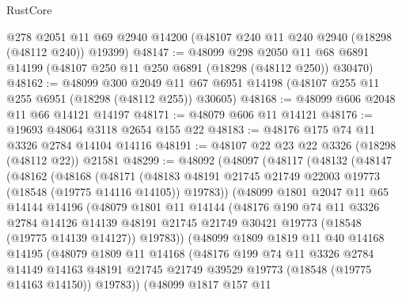 \begin{lexlean}{RustCore}
\begin{coremodule}
    @278
    @2051
    @11
    @69
    @2940
    @14200
    (@48107 @240 @11 @240 @2940 (@18298 (@48112 @240)) @19399)
@48147 := @48099
    @298
    @2050
    @11
    @68
    @6891
    @14199
    (@48107 @250 @11 @250 @6891 (@18298 (@48112 @250)) @30470)
@48162 := @48099
    @300
    @2049
    @11
    @67
    @6951
    @14198
    (@48107 @255 @11 @255 @6951 (@18298 (@48112 @255)) @30605)
@48168 := @48099 @606 @2048 @11 @66 @14121 @14197
@48171 := @48079 @606 @11 @14121
@48176 := @19693 @48064 @3118 @2654 @155 @22
@48183 := @48176 @175 @74 @11 @3326 @2784 @14104 @14116
@48191 := @48107 @22 @23 @22 @3326 (@18298 (@48112 @22)) @21581
@48299 := @48092
    (@48097
      (@48117
        (@48132
          (@48147
            (@48162
              (@48168
                (@48171
                  (@48183
                    @48191
                    @21745
                    @21749
                    @22003
                    @19773
                    (@18548 (@19775 @14116 @14105))
                    @19783))
                (@48099
                  @1801
                  @2047
                  @11
                  @65
                  @14144
                  @14196
                  (@48079
                    @1801
                    @11
                    @14144
                    (@48176
                      @190
                      @74
                      @11
                      @3326
                      @2784
                      @14126
                      @14139
                      @48191
                      @21745
                      @21749
                      @30421
                      @19773
                      (@18548 (@19775 @14139 @14127))
                      @19783))
                  (@48099
                    @1809
                    @1819
                    @11
                    @40
                    @14168
                    @14195
                    (@48079
                      @1809
                      @11
                      @14168
                      (@48176
                        @199
                        @74
                        @11
                        @3326
                        @2784
                        @14149
                        @14163
                        @48191
                        @21745
                        @21749
                        @39529
                        @19773
                        (@18548 (@19775 @14163 @14150))
                        @19783))
                    (@48099
                      @1817
                      @157
                      @11

\end{coremodule}
\end{lexlean}
